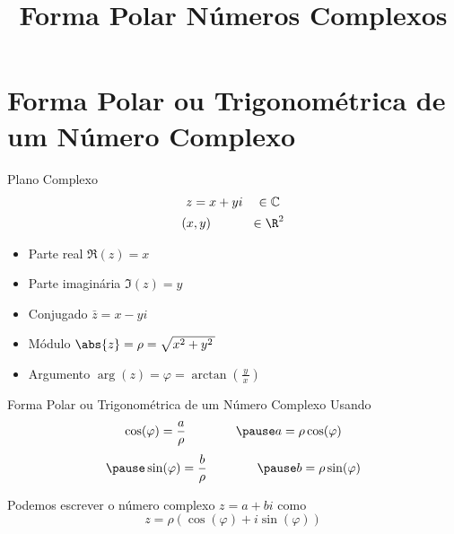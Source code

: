 
\usepackage{calculo_varias_variaveis-1}

\title{Forma Polar Números Complexos}



\addtitle

\section{Forma Polar ou Trigonométrica de um Número Complexo}

\begin{frame}[t]{Plano Complexo}
  \begin{gather*}
    z = x + yi \quad          \in \mathbb{C} \\
    (x, y)     \hspace{7.2ex} \in \R^2
  \end{gather*}


  \pause
  \begin{itemize}[<+->]
    \item Parte real       \tabto{32mm} \( \Re(z) = x \)     \\[4mm]
    \item Parte imaginária \tabto{32mm} \( \Im(z) = y \)     \\[4mm]
    \item Conjugado        \tabto{32mm} \( \bar{z} = x - yi \)        \\[4mm]
    \item Módulo           \tabto{32mm} \( \abs{z} = \rho = \sqrt{x^2+y^2\,}\) \\[4mm]
    \item Argumento        \tabto{32mm} \( \arg{(z)} = \varphi = \arctan\left(\frac{\,y\,}{x}\right)\)
  \end{itemize}
\end{frame}

\begin{frame}{Forma Polar ou Trigonométrica de um Número Complexo}
  Usando
  \[
    \cos(\varphi) = \frac{a}{\rho}
    \qquad\qquad
    \pause
    a = \rho\cos(\varphi)
  \]
  \[
    \pause
    \sin(\varphi) = \frac{b}{\rho}
    \qquad\qquad
    \pause
    b = \rho\sin(\varphi)
  \]

  \pause
  \vspace{\baselineskip}
  Podemos escrever o número complexo \(z=a+bi\) como
  \[
    z = \rho \left( \cos(\varphi) + i\sin(\varphi)\right)
  \]
\end{frame}

